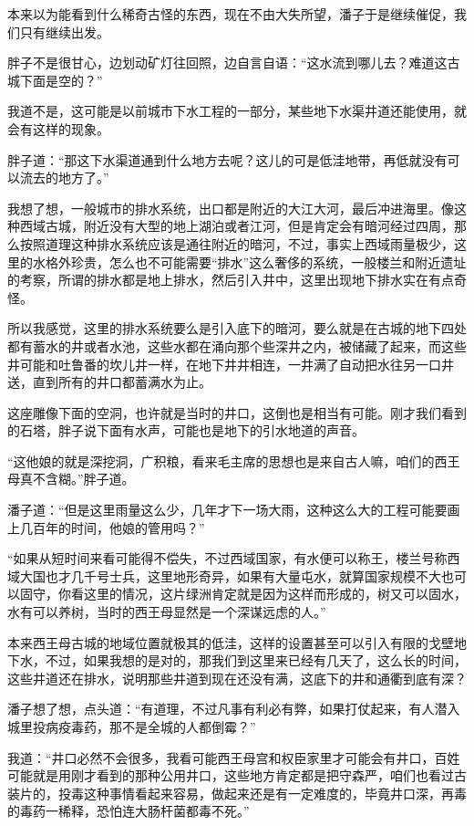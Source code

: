 本来以为能看到什么稀奇古怪的东西，现在不由大失所望，潘子于是继续催促，我们只有继续出发。

胖子不是很甘心，边划动矿灯往回照，边自言自语：“这水流到哪儿去？难道这古城下面是空的？”

我道不是，这可能是以前城市下水工程的一部分，某些地下水渠井道还能使用，就会有这样的现象。

胖子道：“那这下水渠道通到什么地方去呢？这儿的可是低洼地带，再低就没有可以流去的地方了。”

我想了想，一般城市的排水系统，出口都是附近的大江大河，最后冲进海里。像这种西域古城，附近没有大型的地上湖泊或者江河，但是肯定会有暗河经过四周，那么按照道理这种排水系统应该是通往附近的暗河，不过，事实上西域雨量极少，这里的水格外珍贵，怎么也不可能需要“排水”这么奢侈的系统，一般楼兰和附近遗址的考察，所谓的排水都是地上排水，然后引入井中，这里出现地下排水实在有点奇怪。

所以我感觉，这里的排水系统要么是引入底下的暗河，要么就是在古城的地下四处都有蓄水的井或者水池，这些水都在涌向那个些深井之内，被储藏了起来，而这些井可能和吐鲁番的坎儿井一样，在地下井井相连，一井满了自动把水往另一口井送，直到所有的井口都蓄满水为止。

这座雕像下面的空洞，也许就是当时的井口，这倒也是相当有可能。刚才我们看到的石塔，胖子说下面有水声，可能也是地下的引水地道的声音。

“这他娘的就是深挖洞，广积粮，看来毛主席的思想也是来自古人嘛，咱们的西王母真不含糊。”胖子道。

潘子道：“但是这里雨量这么少，几年才下一场大雨，这种这么大的工程可能要画上几百年的时间，他娘的管用吗？”

“如果从短时间来看可能得不偿失，不过西域国家，有水便可以称王，楼兰号称西域大国也才几千号士兵，这里地形奇异，如果有大量屯水，就算国家规模不大也可以固守，你看这里的情况，这片绿洲肯定就是因为这样而形成的，树又可以固水，水有可以养树，当时的西王母显然是一个深谋远虑的人。”

本来西王母古城的地域位置就极其的低洼，这样的设置甚至可以引入有限的戈壁地下水，不过，如果我想的是对的，那我们到这里来已经有几天了，这么长的时间，这些井道还在排水，说明那些井道到现在还没有满，这底下的井和通衢到底有深？

潘子想了想，点头道：“有道理，不过凡事有利必有弊，如果打仗起来，有人潜入城里投病疫毒药，那不是全城的人都倒霉？”

我道：“井口必然不会很多，我看可能西王母宫和权臣家里才可能会有井口，百姓可能就是用刚才看到的那种公用井口，这些地方肯定都是把守森严，咱们也看过古装片的，投毒这种事情看起来容易，做起来还是有一定难度的，毕竟井口深，再毒的毒药一稀释，恐怕连大肠杆菌都毒不死。”

